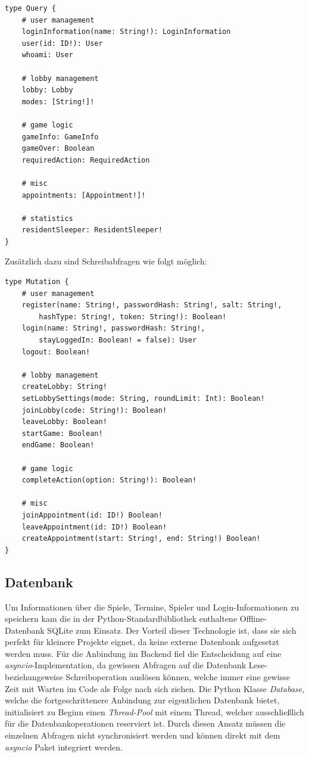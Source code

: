 \begin{lstlisting}
type Query {
	# user management
	loginInformation(name: String!): LoginInformation
	user(id: ID!): User
	whoami: User
	
	# lobby management
	lobby: Lobby
	modes: [String!]!
	
	# game logic
	gameInfo: GameInfo
	gameOver: Boolean
	requiredAction: RequiredAction
	
	# misc
	appointments: [Appointment!]!
	
	# statistics
	residentSleeper: ResidentSleeper!
}
\end{lstlisting}

Zusätzlich dazu sind Schreibabfragen wie folgt möglich:

\begin{lstlisting}
type Mutation {
	# user management
	register(name: String!, passwordHash: String!, salt: String!, 
		hashType: String!, token: String!): Boolean!
	login(name: String!, passwordHash: String!, 
		stayLoggedIn: Boolean! = false): User
	logout: Boolean!
	
	# lobby management
	createLobby: String!
	setLobbySettings(mode: String, roundLimit: Int): Boolean!
	joinLobby(code: String!): Boolean!
	leaveLobby: Boolean!
	startGame: Boolean!
	endGame: Boolean!
	
	# game logic
	completeAction(option: String!): Boolean!
	
	# misc
	joinAppointment(id: ID!) Boolean!
	leaveAppointment(id: ID!) Boolean!
	createAppointment(start: String!, end: String!) Boolean!
}
\end{lstlisting}

\subsection{Datenbank}
Um Informationen über die Spiele, Termine, Spieler und Login-Informationen zu speichern kam die in der Python-Standardbibliothek enthaltene Offline-Datenbank SQLite zum Einsatz. Der Vorteil dieser Technologie ist, dass sie sich perfekt für kleinere Projekte eignet, da keine externe Datenbank aufgesetzt werden muss. Für die Anbindung im Backend fiel die Entscheidung auf eine \textit{asyncio}-Implementation, da gewissen Abfragen auf die Datenbank Lese- beziehungsweise Schreiboperation auslösen können, welche immer eine gewisse Zeit mit Warten im Code als Folge nach sich ziehen. Die Python Klasse \textit{Database}, welche die fortgeschrittenere Anbindung zur eigentlichen Datenbank bietet, initialisiert zu Beginn einen \textit{Thread-Pool} mit einem Thread, welcher ausschließlich für die Datenbankoperationen reserviert ist. Durch diesen Ansatz müssen die einzelnen Abfragen nicht synchronisiert werden und können direkt mit dem \textit{asyncio} Paket integriert werden.

